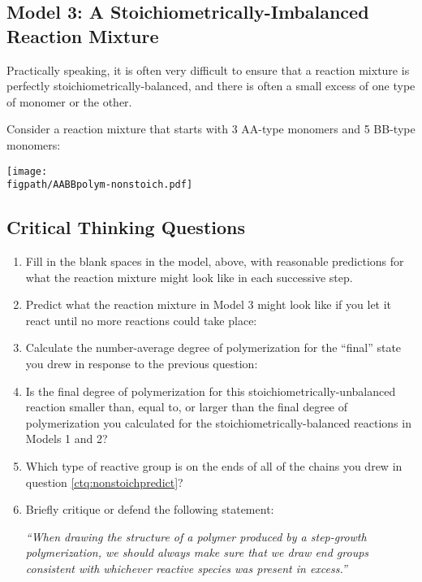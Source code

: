 \subsection{Model 3: A Stoichiometrically-Imbalanced Reaction Mixture}

Practically speaking, it is often very difficult to ensure that a reaction mixture is perfectly stoichiometrically-balanced, and there is often a small excess of one type of monomer or the other.

Consider a reaction mixture that starts with 3 AA-type monomers and 5 BB-type monomers:

\vspace{0.1in}
\centerline{\texttt{[image: \\figpath/AABBpolym-nonstoich.pdf]}}

\subsection*{Critical Thinking Questions}

	\begin{enumerate}[resume]
		\item Fill in the blank spaces in the model, above, with reasonable predictions for what the reaction mixture might look like in each successive step.
		
		\item \label{ctq:nonstoichpredict} Predict what the reaction mixture in Model 3 might look like if you let it react until no more reactions could take place:
		
		\item Calculate the number-average degree of polymerization for the ``final'' state you drew in response to the previous question:
		
		\item Is the final degree of polymerization for this stoichiometrically-unbalanced reaction smaller than, equal to, or larger than the final degree of polymerization you calculated for the stoichiometrically-balanced reactions in Models 1 and 2?
		
		\item Which type of reactive group is on the ends of all of the chains you drew in question \ref{ctq:nonstoichpredict}?
		
		\item Briefly critique or defend the following statement:
		
			\emph{``When drawing the structure of a polymer produced by a step-growth polymerization, we should always make sure that we draw end groups consistent with whichever reactive species was present in excess.''}
			
	\end{enumerate}
	
